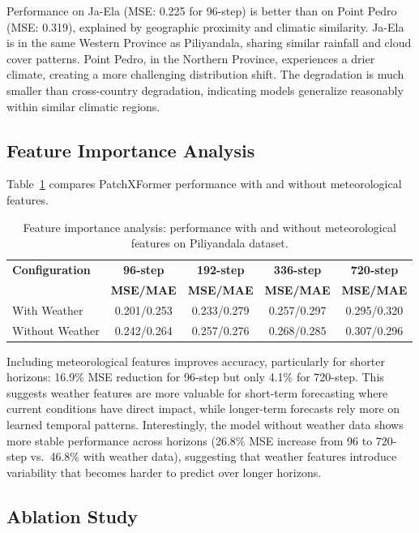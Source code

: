 \documentclass[a4paper,fleqn]{cas-dc}
\begin{document}
Performance on Ja-Ela (MSE: 0.225 for 96-step) is better than on Point Pedro (MSE: 0.319), explained by geographic proximity and climatic similarity. Ja-Ela is in the same Western Province as Piliyandala, sharing similar rainfall and cloud cover patterns. Point Pedro, in the Northern Province, experiences a drier climate, creating a more challenging distribution shift. The degradation is much smaller than cross-country degradation, indicating models generalize reasonably within similar climatic regions.

\subsection{Feature Importance Analysis}

Table~\ref{tab:feature_importance} compares PatchXFormer performance with and without meteorological features.

\begin{table}[width=.9\linewidth,pos=h]
\caption{Feature importance analysis: performance with and without meteorological features on Piliyandala dataset.}\label{tab:feature_importance}
\begin{tabular*}{\tblwidth}{@{} lcccc@{} }
\toprule
\textbf{Configuration} & \textbf{96-step} & \textbf{192-step} & \textbf{336-step} & \textbf{720-step} \\
 & \textbf{MSE/MAE} & \textbf{MSE/MAE} & \textbf{MSE/MAE} & \textbf{MSE/MAE} \\
\midrule
With Weather & 0.201/0.253 & 0.233/0.279 & 0.257/0.297 & 0.295/0.320\\
Without Weather & 0.242/0.264 & 0.257/0.276 & 0.268/0.285 & 0.307/0.296\\
\bottomrule
\end{tabular*}
\end{table}

Including meteorological features improves accuracy, particularly for shorter horizons: 16.9\% MSE reduction for 96-step but only 4.1\% for 720-step. This suggests weather features are more valuable for short-term forecasting where current conditions have direct impact, while longer-term forecasts rely more on learned temporal patterns. Interestingly, the model without weather data shows more stable performance across horizons (26.8\% MSE increase from 96 to 720-step vs.\ 46.8\% with weather data), suggesting that weather features introduce variability that becomes harder to predict over longer horizons.

\subsection{Ablation Study}\label{sec:ablation}
\end{document}
